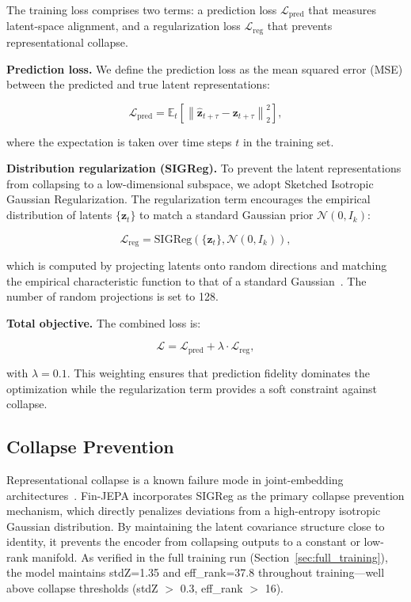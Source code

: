 \documentclass[11pt]{article}
\begin{document}
The training loss comprises two terms: a prediction loss $\mathcal{L}_{\text{pred}}$ that measures latent-space alignment, and a regularization loss $\mathcal{L}_{\text{reg}}$ that prevents representational collapse.

\textbf{Prediction loss.}
We define the prediction loss as the mean squared error (MSE) between the predicted and true latent representations:

\begin{equation}
\mathcal{L}_{\text{pred}} = \mathbb{E}_{t} \left[ \left\| \hat{\mathbf{z}}_{t+\tau} - \mathbf{z}_{t+\tau} \right\|_2^2 \right],
\label{eq:pred_loss}
\end{equation}

where the expectation is taken over time steps $t$ in the training set.

\textbf{Distribution regularization (SIGReg).}
To prevent the latent representations from collapsing to a low-dimensional subspace, we adopt Sketched Isotropic Gaussian Regularization. The regularization term encourages the empirical distribution of latents $\{\mathbf{z}_t\}$ to match a standard Gaussian prior $\mathcal{N}(0, I_k)$:

\begin{equation}
\mathcal{L}_{\text{reg}} = \text{SIGReg}(\{\mathbf{z}_t\}, \mathcal{N}(0, I_k)),
\label{eq:reg_loss}
\end{equation}

which is computed by projecting latents onto random directions and matching the empirical characteristic function to that of a standard Gaussian~\citep{balestriero2025lejepa}. The number of random projections is set to 128.

\textbf{Total objective.}
The combined loss is:

\begin{equation}
\mathcal{L} = \mathcal{L}_{\text{pred}} + \lambda \cdot \mathcal{L}_{\text{reg}},
\label{eq:total_loss}
\end{equation}

with $\lambda = 0.1$. This weighting ensures that prediction fidelity dominates the optimization while the regularization term provides a soft constraint against collapse.

\subsection{Collapse Prevention}

Representational collapse is a known failure mode in joint-embedding architectures~\citep{chen2021simsiam,grill2020byol}. Fin-JEPA incorporates SIGReg as the primary collapse prevention mechanism, which directly penalizes deviations from a high-entropy isotropic Gaussian distribution. By maintaining the latent covariance structure close to identity, it prevents the encoder from collapsing outputs to a constant or low-rank manifold. As verified in the full training run (Section~\ref{sec:full_training}), the model maintains stdZ=1.35 and eff\_rank=37.8 throughout training---well above collapse thresholds (stdZ $>$ 0.3, eff\_rank $>$ 16).
\end{document}
